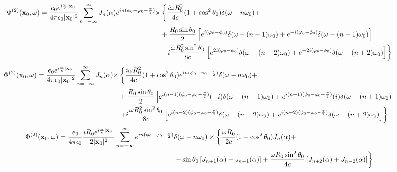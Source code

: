 \begin{align}
    \Phi^{(2)}({\bf x}_0,\omega)  =\frac{e_0 e^{i\frac{\omega}c|{\bf x}_0|}}{4\pi\epsilon_0|{\bf x}_0|^2}\sum\limits_{n=-\infty}^{\infty} J_n(\alpha) e^{in(\phi_0-\varphi_0-\frac{\pi}2)}    \times
     & \left\{\frac{i\omega R_0^2}{4c}(1+\cos^2\theta_0)\delta(\omega-n\omega_0)+\right.                                                                                                       \\                                                                                                                                                                                                & +\frac{R_0\sin\theta_0}{2}\left[e^{i(\varphi_0-\phi_0)}\delta(\omega-(n-1)\omega_0)+e^{-i(\varphi_0-\phi_0)}\delta(\omega-(n+1)\omega_0)\right] \nonumber \\
     & \left. -i\frac{\omega R_0^2 \sin^2\theta_0}{8c}\left[e^{2i(\varphi_0-\phi_0)}\delta(\omega-(n-2)\omega_0)+e^{-2i(\varphi_0-\phi_0)}\delta(\omega-(n+2)\omega_0)\right]\right\}\nonumber
\end{align}
\begin{align}
    \Phi^{(2)}({\bf x}_0,\omega)  =\frac{e_0 e^{i\frac{\omega}c|{\bf x}_0|}}{4\pi\epsilon_0|{\bf x}_0|^2}\sum\limits_{n=-\infty}^{\infty} J_n(\alpha)    \times
     & \left\{\frac{i\omega R_0^2}{4c}(1+\cos^2\theta_0)e^{in(\phi_0-\varphi_0-\frac{\pi}2)} \delta(\omega-n\omega_0)+\right.                                                                                                \\                                                                                                                                                                                                & +\frac{R_0\sin\theta_0}{2}\left[e^{i(n-1)(\phi_0-\varphi_0-\frac{\pi}2)} (-i)\delta(\omega-(n-1)\omega_0)+e^{i(n+1)(\phi_0-\varphi_0-\frac{\pi}2)} (i)\delta(\omega-(n+1)\omega_0)\right] \nonumber \\
     & \left.+i\frac{\omega R_0^2 \sin^2\theta_0}{8c}\left[e^{i(n-2)(\phi_0-\varphi_0-\frac{\pi}2)}\delta(\omega-(n-2)\omega_0)+e^{i(n+2)(\phi_0-\varphi_0-\frac{\pi}2)}\delta(\omega-(n+2)\omega_0)\right]\right\}\nonumber
\end{align}
\begin{align}
    \Phi^{(2)}({\bf x}_0,\omega)  =\frac{e_0 }{4\pi\epsilon_0}\frac{i R_0e^{i\frac{\omega}c|{\bf x}_0|}}{2|{\bf x}_0|^2}
    \sum\limits_{n=-\infty}^{\infty} e^{in(\phi_0-\varphi_0-\frac{\pi}2)} & \delta(\omega-n\omega_0)    \times
    \left\{\frac{\omega R_0}{2c}(1+\cos^2\theta_0)J_n(\alpha)+\right.                                          \\                                                                                                                                                                                                &\left. -\sin\theta_0\left[J_{n+1}(\alpha) - J_{n-1}(\alpha)\right] +\frac{\omega R_0 \sin^2\theta_0}{4c}\left[J_{n+2}(\alpha)+J_{n-2}(\alpha)\right]\right\}\nonumber
\end{align}

